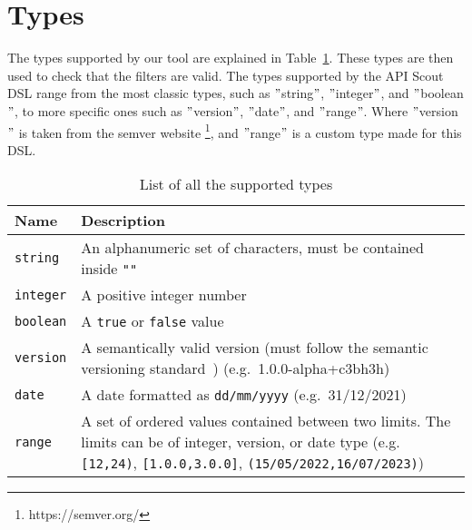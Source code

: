\section{Types}\label{sec:types}
The types supported by our tool are explained in Table~\ref{tab:types}.
These types are then used to check that the filters are valid.
The types supported by the API Scout DSL range from the most classic types, such as \("\)string\("\), \("\)integer\("\), and \("\)boolean\("\), to more specific ones such as \("\)version\("\), \("\)date\("\), and \("\)range\("\).
Where \("\)version\("\) is taken from the semver website \footnote{https://semver.org/}, and \("\)range\("\) is a custom type made for this DSL\@.

\begin{table}[!h]
    \begin{center}
        \begin{tabular}{l p{15cm}}
            \hline
            \textbf{Name} & \textbf{Description} \\ \hline
            \verb|string| & An alphanumeric set of characters, must be contained inside \verb|""| \\
            \verb|integer| & A positive integer number \\
            \verb|boolean| & A \verb|true| or \verb|false| value \\
            \verb|version| & A semantically valid version (must follow the semantic versioning standard~\cite{preston-werner_semantic_nodate}) (e.g.\ 1.0.0-alpha+c3bh3h) \\
            \verb|date| & A date formatted as \verb|dd/mm/yyyy| (e.g.\ 31/12/2021) \\
            \verb|range| & A set of ordered values contained between two limits.
            The limits can be of integer, version, or date type (e.g. \verb|[12,24)|, \verb|[1.0.0,3.0.0]|,  \verb|(15/05/2022,16/07/2023)|) \\ \hline
        \end{tabular}
    \end{center}

    \caption{List of all the supported types}
    \label{tab:types}
\end{table}